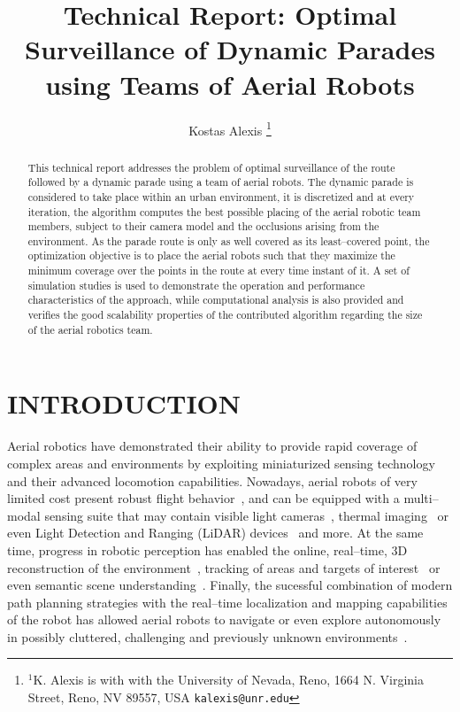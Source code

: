 \documentclass[letterpaper, 10 pt, conference]{ieeeconf}  %
\title{\LARGE \bf
Technical Report: Optimal Surveillance of Dynamic Parades using Teams of Aerial Robots
}
\author{Kostas Alexis%
\thanks{$^{1}$K. Alexis is with with the University of Nevada, Reno,
	1664 N. Virginia Street, Reno, NV 89557, USA
	{\tt\small kalexis@unr.edu}}%
}
\begin{document}
\maketitle
\thispagestyle{empty}
\pagestyle{empty}


\begin{abstract}
This technical report addresses the problem of optimal surveillance of the route followed by a dynamic parade using a team of aerial robots. The dynamic parade is considered to take place within an urban environment, it is discretized and at every iteration, the algorithm computes the best possible placing of the aerial robotic team members, subject to their camera model and the occlusions arising from the environment. As the parade route is only as well covered as its least--covered point, the optimization objective is to place the aerial robots such that they maximize the minimum coverage over the points in the route at every time instant of it. A set of simulation studies is used to demonstrate the operation and performance characteristics of the approach, while computational analysis is also provided and verifies the good scalability properties of the contributed algorithm regarding the size of the aerial robotics team. 
\end{abstract}


\section{INTRODUCTION}

Aerial robotics have demonstrated their ability to provide rapid coverage of complex areas and environments by exploiting miniaturized sensing technology and their advanced locomotion capabilities. Nowadays, aerial robots of very limited cost present robust flight behavior~\cite{alexis2015robust,APST_ECC_14}, and can be equipped with a multi--modal sensing suite that may contain visible light cameras~\cite{JANOSCH_PAPER_INSP,nikolic2014synchronized,PAT_JINT_2015}, thermal imaging~\cite{Oettershagen_FSR2015,OMMRLSLKS_ICRA_15,Doherty_VictimDetection,SEARCH_AND_RESCUE_2008} or even Light Detection and Ranging (LiDAR) devices~\cite{zhang2014loam_loam} and more. At the same time, progress in robotic perception has enabled the online, real--time, $3\textrm{D}$ reconstruction of the environment~\cite{omari2014visual,lynen2013robust,omari2015dense}, tracking of areas and targets of interest~\cite{PAT_ISVC_2015} or even semantic scene understanding~\cite{fernandez2015uav}. Finally, the sucessful combination of modern path planning strategies with the real--time localization and mapping capabilities of the robot has allowed aerial robots to navigate or even explore autonomously in possibly cluttered, challenging and previously unknown environments~\cite{SIP_AURO_2015,bircher_robotica,BABOOMS_ICRA_15,NBVP_ICRA_16,bircher2016receding,APST_MSC_2015,papachristos2016augmented,papachristos2016distributed}. 
\end{document}
